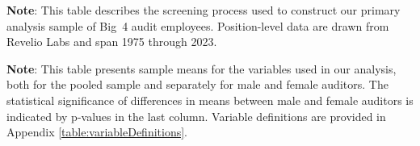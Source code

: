 \documentclass[11pt]{article}
\begin{document}
\clearpage

\clearpage
\begin{landscape}
\begin{table}[!htbp]
\begin{flushleft}
    \begin{threeparttable}[b]

        \captionsetup{labelfont=bf, singlelinecheck=off, justification=raggedright, labelsep=none}
        \caption{: Sample design}

        

        \begin{tablenotes}
            \footnotesize
            \item \textbf{Note}: This table describes the screening process used to construct our primary analysis sample of Big~4 audit employees. Position-level data are drawn from Revelio Labs and span 1975 through 2023.
        \end{tablenotes}
        \label{table:sampleDesign}
    \end{threeparttable}
\end{flushleft}
\end{table}
\end{landscape}

\clearpage
\begin{landscape}
\begin{table}[!htbp]
\begin{flushleft}
    \begin{threeparttable}[b]

        \captionsetup{labelfont=bf, singlelinecheck=off, justification=raggedright, labelsep=none}
        \caption{: Gender differences in mean values}

        

        \begin{tablenotes}
            \footnotesize
            \item \textbf{Note}: This table presents sample means for the variables used in our analysis, both for the pooled sample and separately for male and female auditors. The statistical significance of differences in means between male and female auditors is indicated by p-values in the last column. Variable definitions are provided in Appendix \ref{table:variableDefinitions}.
        \end{tablenotes}
        \label{table:summaryStats}
    \end{threeparttable}
\end{flushleft}
\end{table}
\end{landscape}
\end{document}
